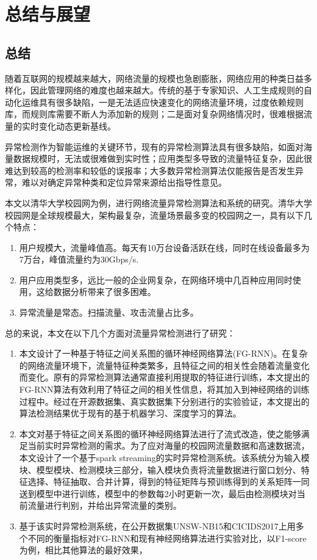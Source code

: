 \chapter{总结与展望}
\section{总结}
随着互联网的规模越来越大，网络流量的规模也急剧膨胀，网络应用的种类日益多样化，因此管理网络的难度也越来越大。传统的基于专家知识、人工生成规则的自动化运维具有很多缺陷，一是无法适应快速变化的网络流量环境，过度依赖规则库，而规则库需要不断人为添加新的规则；二是面对复杂网络情况时，很难根据流量的实时变化动态更新基线。

异常检测作为智能运维的关键环节，现有的异常检测算法具有很多缺陷，如面对海量数据规模时，无法或很难做到实时性；应用类型多导致的流量特征复杂，因此很难达到较高的检测率和较低的误报率；大多数异常检测算法仅能报告是否发生异常，难以对确定异常种类和定位异常来源给出指导性意见。

本文以清华大学校园网为例，进行网络流量异常检测算法和系统的研究。清华大学校园网是全球规模最大，架构最复杂，流量场景最多变的校园网之一，具有以下几个特点：
\begin{enumerate}
    \item 用户规模大，流量峰值高。每天有10万台设备活跃在线，同时在线设备最多为7万台，峰值流量约为30Gbps/s.
    \item	用户应用类型多，远比一般的企业网复杂，在网络环境中几百种应用同时使用，这给数据分析带来了很多困难。
    \item	异常流量是常态。扫描流量、攻击流量占比多。
\end{enumerate}

总的来说，本文在以下几个方面对流量异常检测进行了研究：
\begin{enumerate}
    \item 本文设计了一种基于特征之间关系图的循环神经网络算法(FG-RNN)。在复杂的网络流量环境下，流量特征种类繁多，且特征之间的相关性会随着流量变化而变化。原有的异常检测算法通常直接利用提取的特征进行训练，本文提出的FG-RNN算法有效利用了特征之间的相关性信息，将其加入到神经网络的训练过程中。经过在开源数据集、真实数据集下分别进行的实验验证，本文提出的算法检测结果优于现有的基于机器学习、深度学习的算法。
    \item 本文对基于特征之间关系图的循环神经网络算法进行了流式改造，使之能够满足当前实时异常检测的需求。为了应对海量的校园网流量数据和高速数据流，本文设计了一个基于spark streaming的实时异常检测系统。该系统分为输入模块、模型模块、检测模块三部分，输入模块负责将流量数据进行窗口划分、特征选择、特征抽取、合并计算，得到的特征矩阵与预训练得到的关系矩阵一同送到模型中进行训练，模型中的参数每2小时更新一次，最后由检测模块对当前流量进行判别，并给出异常流量的类别。
    \item 基于该实时异常检测系统，在公开数据集UNSW-NB15和CICIDS2017上用多个不同的衡量指标对FG-RNN和现有神经网络算法进行实验对比，以F1-score为例，相比其他算法的最好效果，
\end{enumerate}


